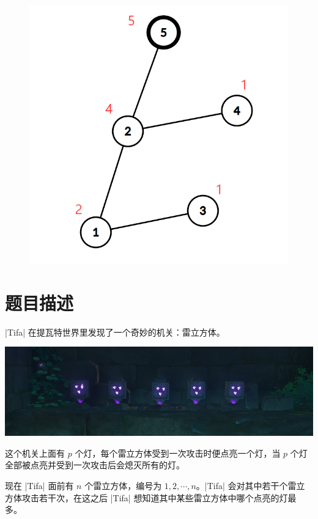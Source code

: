 \documentclass{ctpro}
\begin{document}
\begin{figure}
	\includegraphics[scale=0.14]{images/D_5.png}
\end{figure}

\makeproblem
\section*{题目描述}

|Tifa| 在提瓦特世界里发现了一个奇妙的机关：雷立方体。

\vspace{0.2em}

\begin{center}
    \includegraphics[width=\linewidth]{images/E_1.png}
\end{center}

这个机关上面有 $p$ 个灯，每个雷立方体受到一次攻击时便点亮一个灯，当 $p$ 个灯全部被点亮并受到一次攻击后会熄灭所有的灯。

现在 |Tifa| 面前有 $n$ 个雷立方体，编号为 $1,2, \cdots, n$。|Tifa| 会对其中若干个雷立方体攻击若干次，在这之后 |Tifa| 想知道其中某些雷立方体中哪个点亮的灯最多。
\end{document}
